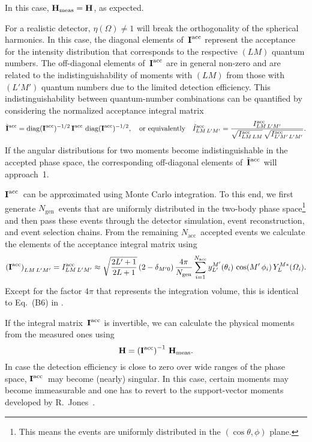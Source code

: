 In this case, $\bm{\mathrm{H}}_\text{meas} = \bm{\mathrm{H}}$, as expected.

For a realistic detector, $\eta(\Omega) \neq 1$ will break the
orthogonality of the spherical harmonics.  In this case, the diagonal
elements of~$\bm{\mathrm{I}}^\text{acc}$ represent the acceptance for the
intensity distribution that corresponds to the respective $(L M)$
quantum numbers.  The off-diagonal elements of~$\bm{\mathrm{I}}^\text{acc}$
are in general non-zero and are related to the indistinguishability of
moments with $(L M)$ from those with $(L' M')$ quantum numbers due to
the limited detection efficiency.  This indistinguishability between
quantum-number combinations can be quantified by considering the
normalized acceptance integral matrix
\begin{equation}
  \tilde{\bm{\mathrm{I}}}^\text{acc}
  = \operatorname{diag}(\bm{\mathrm{I}}^\text{acc})^{-1/2}\, \bm{\mathrm{I}}^\text{acc}\, \operatorname{diag}(\bm{\mathrm{I}}^\text{acc})^{-1/2},
  \quad\text{or equivalently}\quad
  \tilde{I}^\text{acc}_{L M\, L' M'}
  = \frac{I^\text{acc}_{L M\, L' M'}}{\sqrt{I^\text{acc}_{L M\, L M}}\, \sqrt{I^\text{acc}_{L' M'\, L' M'}}}.
\end{equation}
If the angular distributions for two moments become indistinguishable
in the accepted phase space, the corresponding off-diagonal elements
of~$\tilde{\bm{\mathrm{I}}}^\text{acc}$ will approach~1.

$\bm{\mathrm{I}}^\text{acc}$~can be approximated using Monte Carlo
integration.  To this end, we first generate $N_\text{gen}$~events
that are uniformly distributed in the two-body phase
space\footnote{This means the events are uniformly distributed in the
$(\cos\theta, \phi)$ plane.} and then pass these events through the
detector simulation, event reconstruction, and event selection chains.
From the remaining $N_\text{acc}$~accepted events we calculate the
elements of the acceptance integral matrix using
\begin{equation}
  \label{eq:diffraction_integral_matrix}
  \rBrk{\mat{I}^\text{acc}}_{L M\, L' M'}
  = I^\text{acc}_{L M\, L' M'}
  \approx \sqrt{\frac{2 L' + 1}{2 L + 1}}\, (2 - \delta_{M' 0})\,
  \frac{4 \pi}{N_\text{gen}} \sum_{i = 1}^{N_\text{acc}} y_{L'}^{M'}(\theta_i)\, \cos(M'\, \phi_i)\, Y_L^{M *}(\Omega_i).
\end{equation}
Except for the factor $4 \pi$ that represents the integration volume,
this is identical to Eq.~(B6) in .

If the integral matrix~$\bm{\mathrm{I}}^\text{acc}$ is invertible, we can
calculate the physical moments from the measured ones using
\begin{equation}
  \label{eq:diffraction_phys_moments}
  \vect{H}
  = \rBrk[0]{\mat{I}^\text{acc}}^{-1}\, \vect{H}_\text{meas}.
\end{equation}
In case the detection efficiency is close to zero over wide ranges of
the phase space, $\bm{\mathrm{I}}^\text{acc}$~may become (nearly) singular.
In this case, certain moments may become immeasurable and one has to
revert to the support-vector moments developed by
R.~Jones~\cite{Jones:2023}.


